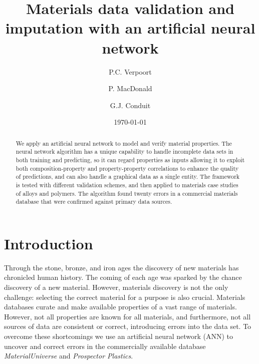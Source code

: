\documentclass[review]{elsarticle}
\newcommand{\change}[1]{#1}
\begin{document}
\title{Materials data validation and imputation with an artificial neural network}
\author{P.C. Verpoort}
\address{University of Cambridge, J.J. Thomson Avenue, Cambridge, CB3 0HE, United Kingdom}
\author{P. MacDonald}
\address{Granta Design, 62 Clifton Road, Cambridge, CB1 7EG, United Kingdom}
\author{G.J. Conduit}
\address{University of Cambridge, J.J. Thomson Avenue, Cambridge, CB3 0HE, United Kingdom}
\date{\today}

\begin{abstract}
We apply an artificial neural network to model and verify material
properties. The neural network algorithm has a unique capability to handle
incomplete data sets in both training and predicting, \change{so it can
regard properties as inputs allowing it to} exploit \change{both}
composition-property and property-property correlations to enhance the
quality of predictions, and can also handle a graphical data as a single
entity. The framework is tested with different validation schemes, and then
applied to materials case studies of alloys and polymers. The algorithm
found twenty errors in a commercial materials database that were confirmed
against primary data sources.
\end{abstract}

\maketitle

\section{Introduction}

Through the stone, bronze, and iron ages the discovery of new materials has
chronicled human history. The coming of each age was sparked by the chance
discovery of a new material. However, materials discovery is not the only
challenge: selecting the correct material for a purpose is also
crucial\cite{Ashby04}. Materials databases curate and make available
properties of a vast range of
materials\cite{Jain13,NoMaD,MatWeb,MaterialUniverse,ProspectorPlastics}. However,
not all properties are known for all materials, and furthermore, not all
sources of data are consistent or correct, introducing errors into the data
set. To overcome these shortcomings we use an artificial neural network
(ANN) to uncover and correct errors in the commercially available database
\textit{MaterialUniverse}\cite{MaterialUniverse} and \textit{Prospector
  Plastics}\cite{ProspectorPlastics}.
\end{document}
